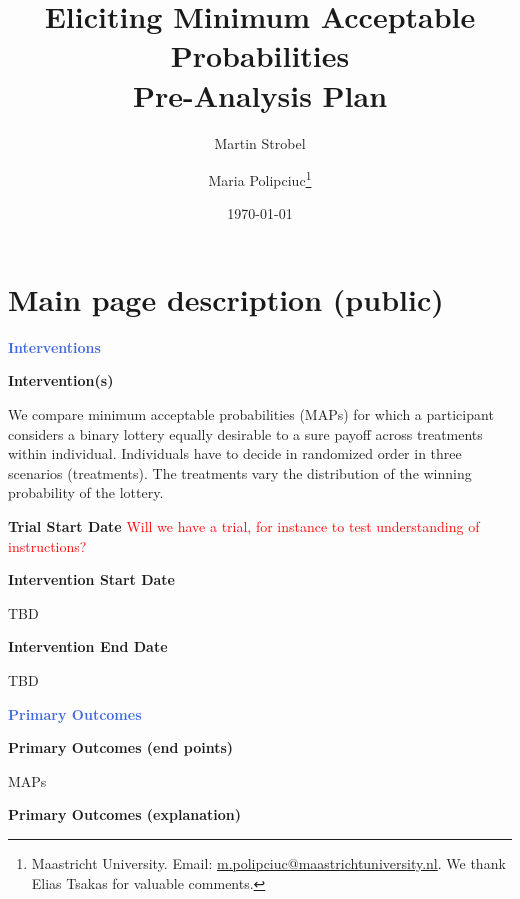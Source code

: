 \usepackage{preliminary}

\title{Eliciting Minimum Acceptable Probabilities \\
\Large Pre-Analysis Plan}
\author{Martin Strobel  \and Maria Polipciuc\thanks{Maastricht University. Email: \url{m.polipciuc@maastrichtuniversity.nl}. We thank Elias Tsakas for valuable comments.}}
\date{\today	\vspace{1cm}}
\titlepage



\begin{titlepage}
\clearpage\maketitle
\thispagestyle{empty}

\end{titlepage}
\section{Main page description (public)}
\large \textcolor{RoyalBlue}{\textbf{Interventions}}

\normalsize \noindent \textcolor{NavyBlue}{\textbf{Intervention(s)}}

We compare minimum acceptable probabilities (MAPs) for which a participant considers a binary lottery equally desirable to a sure payoff across treatments within individual.
Individuals have to decide in randomized order in three scenarios (treatments).
The treatments vary the distribution of the winning probability of the lottery.

\noindent \textcolor{NavyBlue}{\textbf{Trial Start Date}}
\textcolor{red}{Will we have a trial, for instance to test understanding of instructions?}

\noindent \textcolor{NavyBlue}{\textbf{Intervention Start Date}}

TBD

\noindent \textcolor{NavyBlue}{\textbf{Intervention End Date}}

TBD



\large \noindent \textcolor{RoyalBlue}{\textbf{Primary Outcomes}}

\normalsize \noindent \textcolor{NavyBlue}{\textbf{Primary Outcomes (end points)}}

MAPs

\noindent \textcolor{NavyBlue}{\textbf{Primary Outcomes (explanation)}}

